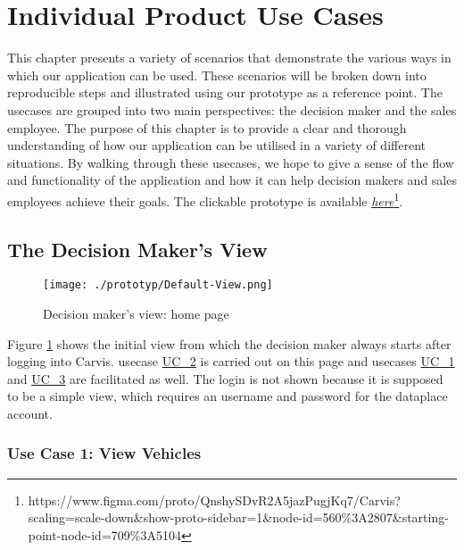\section{Individual Product Use Cases}

This chapter presents a variety of scenarios that demonstrate the various ways in which our application can be used. These scenarios will be broken down into reproducible steps and illustrated using our prototype as a reference point. The \glspl{usecase} are grouped into two main perspectives: the decision maker and the sales employee. The purpose of this chapter is to provide a clear and thorough understanding of how our application can be utilised in a variety of different situations. By walking through these \glspl{usecase}, we hope to give a sense of the flow and functionality of the application and how it can help decision makers and sales employees achieve their goals.
The clickable prototype is available \href{https://www.figma.com/proto/QnshySDvR2A5jazPugjKq7/Carvis?scaling=scale-down&show-proto-sidebar=1&node-id=560%3A2807&starting-point-node-id=709%3A5104}{\emph{here}}\footnote[2]{https://www.figma.com/proto/QnshySDvR2A5jazPugjKq7/Carvis?scaling=scale-down\&show-proto-sidebar=1\&node-id=560\%3A2807\&starting-point-node-id=709\%3A5104}.

\subsection{The Decision Maker's View}

\begin{figure}[H]
  \centering
  \texttt{[image: ./prototyp/Default-View.png]}
  \caption{Decision maker's view: home page}
  \label{DecisionMaker:Homepage}
\end{figure}

Figure \ref{DecisionMaker:Homepage} shows the initial view from which the decision maker always starts after logging into Carvis. \Gls{usecase} \hyperlink{Ref:UC2}{UC\_2} is carried out on this page and \glspl{usecase} \hyperlink{Ref:UC1}{UC\_1} and \hyperlink{Ref:UC3}{UC\_3} are facilitated as well. The login is not shown because it is supposed to be a simple view, which requires an username and password for the \gls{dataplace} account.


\subsubsection{Use Case 1: View Vehicles}

